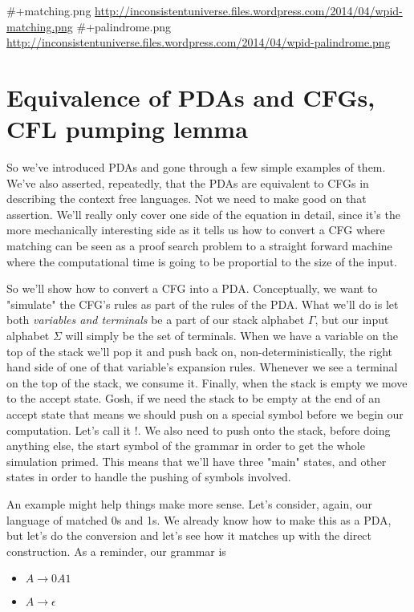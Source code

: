 \documentclass[11pt]{article}
\begin{document}
\#+matching.png \url{http://inconsistentuniverse.files.wordpress.com/2014/04/wpid-matching.png}
\#+palindrome.png \url{http://inconsistentuniverse.files.wordpress.com/2014/04/wpid-palindrome.png}
\section{Equivalence of PDAs and CFGs, CFL pumping lemma}
\label{sec-8}
So we've introduced PDAs and gone through a few simple examples of them. We've also asserted, repeatedly, that the PDAs are equivalent to CFGs in describing the context free languages. Not we need to make good on that assertion. We'll really only cover one side of the equation in detail, since it's the more mechanically interesting side as it tells us how to convert a CFG where matching can be seen as a proof search problem to a straight forward machine where the computational time is going to be proportial to the size of the input. 

So we'll show how to convert a CFG into a PDA. Conceptually, we want to "simulate" the CFG's rules as part of the rules of the PDA. What we'll do is let both \emph{variables and terminals} be a part of our stack alphabet $\Gamma$, but our input alphabet $\Sigma$ will simply be the set of terminals. When we have a variable on the top of the stack we'll pop it and push back on, non-deterministically, the right hand side of one of that variable's expansion rules. Whenever we see a terminal on the top of the stack, we consume it. Finally, when the stack is empty we move to the accept state. Gosh, if we need the stack to be empty at the end of an accept state that means we should push on a special symbol before we begin our computation. Let's call it $!$. We also need to push onto the stack, before doing anything else, the start symbol of the grammar in order to get the whole simulation primed. This means that we'll have three "main" states, and other states in order to handle the pushing of symbols involved. 

An example might help things make more sense. Let's consider, again, our language of matched 0s and 1s. We already know how to make this as a PDA, but let's do the conversion and let's see how it matches up with the direct construction. As a reminder, our grammar is 

\begin{itemize}
\item $A \to 0A1$
\item $A \to \epsilon$
\end{itemize}
\end{document}
